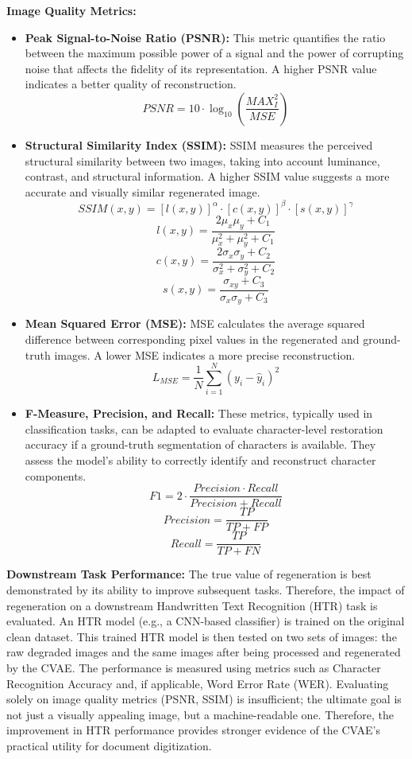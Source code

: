 \documentclass[conference]{IEEEtran}
\begin{document}
\textbf{Image Quality Metrics:}
\begin{itemize}[noitemsep,topsep=0pt,parsep=0pt,partopsep=0pt]
    \item \textbf{Peak Signal-to-Noise Ratio (PSNR):} This metric quantifies the ratio between the maximum possible power of a signal and the power of corrupting noise that affects the fidelity of its representation. A higher PSNR value indicates a better quality of reconstruction.\cite{Emuru2023}
$$PSNR = 10 \cdot \log_{10} \left( \frac{MAX_I^2}{MSE} \right)$$

    \item \textbf{Structural Similarity Index (SSIM):} SSIM measures the perceived structural similarity between two images, taking into account luminance, contrast, and structural information. A higher SSIM value suggests a more accurate and visually similar regenerated image.
$$SSIM(x, y) = [l(x, y)]^{\alpha} \cdot [c(x, y)]^{\beta} \cdot [s(x, y)]^{\gamma}$$ $$l(x, y) = \frac{2\mu_x\mu_y + C_1}{\mu_x^2 + \mu_y^2 + C_1}$$ $$c(x, y) = \frac{2\sigma_x\sigma_y + C_2}{\sigma_x^2 + \sigma_y^2 + C_2}$$
$$s(x, y) = \frac{\sigma_{xy} + C_3}{\sigma_x\sigma_y + C_3}$$


    \item \textbf{Mean Squared Error (MSE):} MSE calculates the average squared difference between corresponding pixel values in the regenerated and ground-truth images. A lower MSE indicates a more precise reconstruction.
$$L_{MSE} = \frac{1}{N} \sum_{i=1}^{N} (y_i - \hat{y}_i)^2$$

    \item \textbf{F-Measure, Precision, and Recall:} These metrics, typically used in classification tasks, can be adapted to evaluate character-level restoration accuracy if a ground-truth segmentation of characters is available. They assess the model's ability to correctly identify and reconstruct character components.\cite{Emuru2023, Bhunia2023, Hebbi2023}
$$F1 = 2 \cdot \frac{Precision \cdot Recall}{Precision + Recall}$$
$$Precision = \frac{TP}{TP + FP}$$
$$Recall = \frac{TP}{TP + FN}$$

\end{itemize}

\textbf{Downstream Task Performance:}
\justify
The true value of regeneration is best demonstrated by its ability to improve subsequent tasks. Therefore, the impact of regeneration on a downstream Handwritten Text Recognition (HTR) task is evaluated. An HTR model (e.g., a CNN-based classifier) is trained on the original clean dataset. This trained HTR model is then tested on two sets of images: the raw degraded images and the same images after being processed and regenerated by the CVAE. The performance is measured using metrics such as Character Recognition Accuracy and, if applicable, Word Error Rate (WER).\cite{Bhunia2023, Hebbi2023} Evaluating solely on image quality metrics (PSNR, SSIM) is insufficient; the ultimate goal is not just a visually appealing image, but a machine-readable one. Therefore, the improvement in HTR performance provides stronger evidence of the CVAE's practical utility for document digitization.
\end{document}
